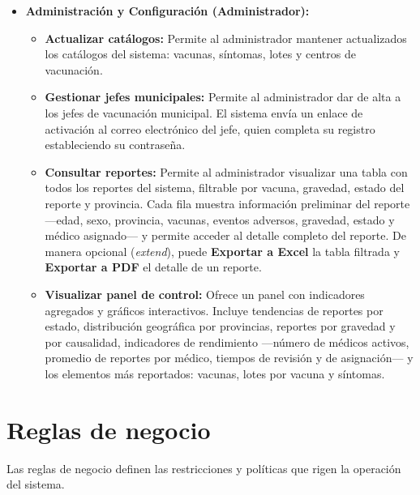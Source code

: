 \begin{itemize}
    \item \textbf{Administración y Configuración (Administrador):}
    \begin{itemize}
        \item \textbf{Actualizar catálogos:} Permite al administrador mantener actualizados los catálogos del sistema: vacunas, síntomas, lotes y centros de vacunación.
        \item \textbf{Gestionar jefes municipales:} Permite al administrador dar de alta a los jefes de vacunación municipal. El sistema envía un enlace de activación al correo electrónico del jefe, quien completa su registro estableciendo su contraseña.
        \item \textbf{Consultar reportes:} Permite al administrador visualizar una tabla con todos los reportes del sistema, filtrable por vacuna, gravedad, estado del reporte y provincia. Cada fila muestra información preliminar del reporte —edad, sexo, provincia, vacunas, eventos adversos, gravedad, estado y médico asignado— y permite acceder al detalle completo del reporte. De manera opcional (\textit{extend}), puede \textbf{Exportar a Excel} la tabla filtrada y \textbf{Exportar a PDF} el detalle de un reporte.
        \item \textbf{Visualizar panel de control:} Ofrece un panel con indicadores agregados y gráficos interactivos. Incluye tendencias de reportes por estado, distribución geográfica por provincias, reportes por gravedad y por causalidad, indicadores de rendimiento —número de médicos activos, promedio de reportes por médico, tiempos de revisión y de asignación— y los elementos más reportados: vacunas, lotes por vacuna y síntomas.
    \end{itemize}


\end{itemize}

\section{Reglas de negocio}
\label{section:reglas_negocio}

Las reglas de negocio definen las restricciones y políticas que rigen la operación del sistema. 

